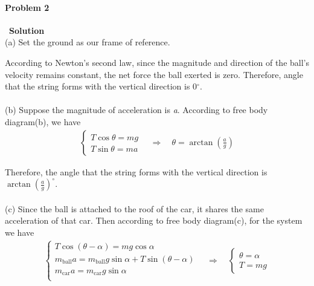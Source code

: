 \documentclass[12pt,a4paper]{article}
\begin{document}
\paragraph{\large \textbf{Problem 2}}~{\textbf{Solution}}
\vspace{2mm}\\
\noindent (a) Set the ground as our frame of reference.
\par According to Newton's second law, since the magnitude and direction of the ball's velocity remains constant, the net force the ball exerted is zero. Therefore, angle that the string forms with the vertical direction is 0$^\circ$.\\ \\
\noindent (b) Suppose the magnitude of acceleration is \textit{a}. According to free body diagram(b), we have
\begin{align*}
	\left\{ \begin{array}{c}
		T\cos\theta = mg\\
		T\sin\theta = ma	
	\end{array} \right.
	\quad \Rightarrow \quad
	\theta = \arctan(\frac{a}{g})
\end{align*}
\par Therefore, the angle that the string forms with the vertical direction is $\arctan(\frac{a}{g})^\circ$.\\ \\
\noindent (c) Since the ball is attached to the roof of the car, it shares the same acceleration of that car. Then according to free body diagram(c), for the system we have
\begin{align*}
	\left\{ \begin{array}{c}
		T\cos(\theta - \alpha) = mg\cos\alpha\\
		m_{\text{ball}}a = m_{\text{ball}}g\sin\alpha + T\sin(\theta - \alpha)\\
		m_{\text{car}}a = m_{\text{car}}g\sin\alpha\\			
	\end{array} \right.	
	\quad \Rightarrow \quad
	\left\{ \begin{array}{c}
		\theta = \alpha\\
		T = mg
	\end{array} \right.
\end{align*}
\end{document}
